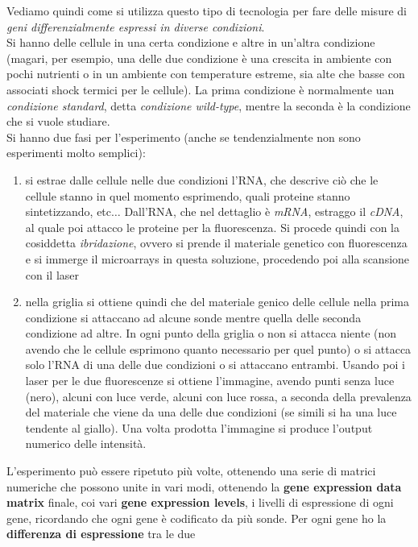 \documentclass[a4paper,12pt, oneside]{book}
\begin{document}
Vediamo quindi come si utilizza questo tipo di tecnologia per fare delle misure
di \textit{geni differenzialmente espressi in diverse condizioni}.\\
Si hanno delle cellule in una certa condizione e altre in un'altra condizione
(magari, per esempio, una delle due condizione è una crescita in ambiente con
pochi nutrienti o in un ambiente con temperature estreme, sia alte che basse con
associati shock termici per le cellule). La prima condizione è normalmente uan
\textit{condizione standard}, detta \textit{condizione wild-type}, mentre la
seconda è la condizione che si vuole studiare.\\
Si hanno due fasi per l'esperimento (anche se tendenzialmente non sono
esperimenti molto semplici):
\begin{enumerate}
  \item si estrae dalle cellule nelle due condizioni l'RNA, che descrive ciò che
  le cellule stanno in quel momento esprimendo, quali proteine stanno
  sintetizzando, etc$\ldots$ Dall'RNA, che nel dettaglio è \textit{mRNA},
  estraggo il \textit{cDNA}, al quale poi attacco le proteine per la
  fluorescenza. Si procede quindi con la cosiddetta \textit{ibridazione}, ovvero
  si prende il materiale genetico con fluorescenza e si immerge il
  microarrays in questa soluzione, procedendo poi alla scansione con il
  laser
  \item nella griglia si ottiene quindi che del materiale genico delle cellule
  nella prima condizione si attaccano ad alcune sonde mentre quella delle
  seconda condizione ad altre. In ogni punto della griglia o non si attacca
  niente (non avendo che le cellule esprimono quanto necessario per quel punto)
  o si attacca solo l'RNA di una delle due condizioni o si attaccano entrambi.
  Usando poi i laser per le due fluorescenze si ottiene l'immagine, avendo punti
  senza luce (nero), alcuni con luce verde, alcuni con luce rossa, a seconda
  della prevalenza del materiale che viene da una delle due condizioni (se
  simili si ha una luce tendente al giallo). Una volta prodotta l'immagine si
  produce l'output numerico delle intensità. 
\end{enumerate}
L'esperimento può essere ripetuto più volte, ottenendo una serie di matrici
numeriche che possono unite in vari modi, ottenendo la \textbf{gene expression
  data matrix} finale, coi vari \textbf{gene expression levels}, i livelli di
espressione di ogni gene, ricordando che ogni gene è codificato da più
sonde. Per ogni gene ho la \textbf{differenza di espressione} tra le due
\end{document}
